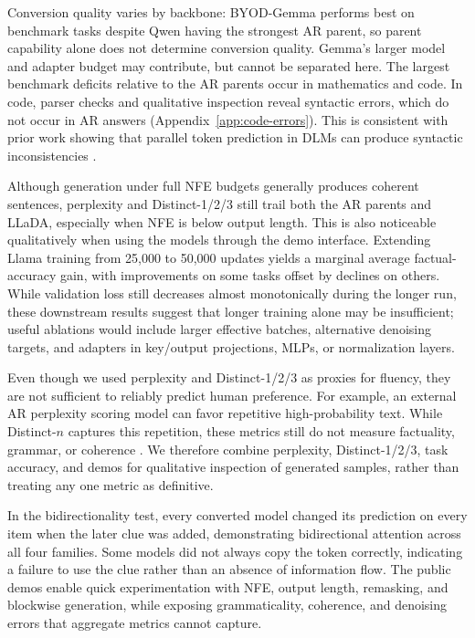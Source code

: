 \documentclass{article}
\begin{document}
Conversion quality varies by backbone: BYOD-Gemma performs best on benchmark tasks despite Qwen having the strongest AR parent, so parent capability alone does not determine conversion quality. Gemma's larger model and adapter budget may contribute, but cannot be separated here. The largest benchmark deficits relative to the AR parents occur in mathematics and code. In code, parser checks and qualitative inspection reveal syntactic errors, which do not occur in AR answers (Appendix~\ref{app:code-errors}). This is consistent with prior work showing that parallel token prediction in DLMs can produce syntactic inconsistencies \citep{hersche2026codila}.

Although generation under full NFE budgets generally produces coherent sentences, perplexity and Distinct-1/2/3 still trail both the AR parents and LLaDA, especially when NFE is below output length. This is also noticeable qualitatively when using the models through the demo interface. Extending Llama training from 25,000 to 50,000 updates yields a marginal average factual-accuracy gain, with improvements on some tasks offset by declines on others. While validation loss still decreases almost monotonically during the longer run, these downstream results suggest that longer training alone may be insufficient; useful ablations would include larger effective batches, alternative denoising targets, and adapters in key/output projections, MLPs, or normalization layers.

Even though we used perplexity and Distinct-1/2/3 as proxies for fluency, they are not sufficient to reliably predict human preference. For example, an external AR perplexity scoring model can favor repetitive high-probability text. While Distinct-$n$ captures this repetition, these metrics still do not measure factuality, grammar, or coherence \citep{gong2025diffullama,turok2026duel}. We therefore combine perplexity, Distinct-1/2/3, task accuracy, and demos for qualitative inspection of generated samples, rather than treating any one metric as definitive.

In the bidirectionality test, every converted model changed its prediction on every item when the later clue was added, demonstrating bidirectional attention across all four families. Some models did not always copy the token correctly, indicating a failure to use the clue rather than an absence of information flow. The public demos enable quick experimentation with NFE, output length, remasking, and blockwise generation, while exposing grammaticality, coherence, and denoising errors that aggregate metrics cannot capture.
\end{document}
